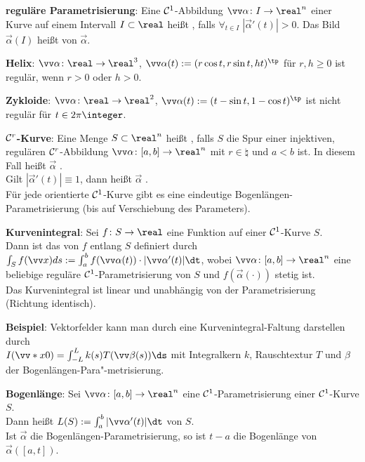 \textbf{reguläre Parametrisierung}:
Eine $\mathcal{C}^1$-Abbildung $\vec{\alpha}\colon I \to \real^n$ einer Kurve
auf einem Intervall $I \subset \real$ heißt , falls
$\forall_{t \in I}\; |\vec{\alpha}'(t)| > 0$.
Das Bild $\vec{\alpha}(I)$ heißt  von $\vec{\alpha}$.

\textbf{Helix}:
$\vec{\alpha}\colon \real \to \real^3$, $\vec{\alpha}(t) := (r \cos t, r \sin t, ht)^\tp$
für $r, h \ge 0$ ist regulär, wenn $r > 0$ oder $h > 0$.

\textbf{Zykloide}:
$\vec{\alpha}\colon \real \to \real^2$, $\vec{\alpha}(t) := (t - \sin t, 1 - \cos t)^\tp$
ist nicht regulär für $t \in 2\pi\integer$.

\textbf{$\mathcal{C}^r$-Kurve}:
Eine Menge $S \subset \real^n$ heißt , falls $S$ die Spur
einer injektiven, regulären $\mathcal{C}^r$-Abbildung $\vec{\alpha}\colon [a, b] \to \real^n$
mit $r \in \natural$ und $a < b$ ist.
In diesem Fall heißt $\vec{\alpha}$ .\\
Gilt $|\vec{\alpha}'(t)| \equiv 1$, dann heißt $\vec{\alpha}$
.\\
Für jede orientierte $\mathcal{C}^1$-Kurve gibt es eine eindeutige Bogenlängen-Parametrisierung
(bis auf Verschiebung des Parameters).

\linie

\textbf{Kurvenintegral}:
Sei $f\colon S \to \real$ eine Funktion auf einer $\mathcal{C}^1$-Kurve $S$.\\
Dann ist das  von $f$ entlang $S$ definiert durch
$\int_S f(\vec{x}) ds := \int_a^b f(\vec{\alpha}(t)) \cdot |\vec{\alpha}'(t)| \dt$,
wobei $\vec{\alpha}\colon [a, b] \to \real^n$ eine beliebige reguläre $\mathcal{C}^1$-Parametrisierung
von $S$ und $f(\vec{\alpha}(\cdot))$ stetig ist.\\
Das Kurvenintegral ist linear und unabhängig von der Parametrisierung
(Richtung identisch).

\textbf{Beispiel}:
Vektorfelder kann man durch eine Kurvenintegral-Faltung darstellen durch\\
$I(\vec*{x}{0}) = \int_{-L}^L k(s) T(\vec{\beta}(s)) \ds$ mit
Integralkern $k$, Rauschtextur $T$ und $\beta$ der Bogenlängen-Para"-metrisierung.

\linie

\textbf{Bogenlänge}:
Sei $\vec{\alpha}\colon [a, b] \to \real^n$ eine $\mathcal{C}^1$-Parametrisierung einer $\mathcal{C}^1$-Kurve $S$.\\
Dann heißt $L(S) := \int_a^b |\vec{\alpha}'(t)| \dt$  von $S$.\\
Ist $\vec{\alpha}$ die Bogenlängen-Parametrisierung, so ist
$t - a$ die Bogenlänge von $\vec{\alpha}([a, t])$.

